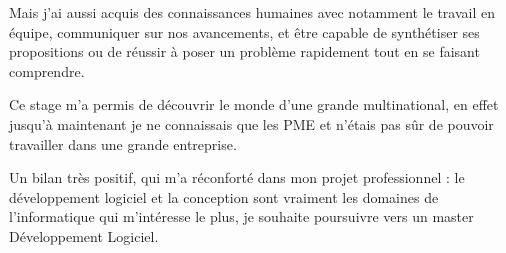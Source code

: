 	Mais j'ai aussi acquis des connaissances humaines avec notamment le travail en équipe, communiquer sur nos avancements, et être capable de synthétiser ses
	propositions ou de réussir à poser un problème rapidement tout en se faisant comprendre.

	Ce stage m'a permis de découvrir le monde d'une grande multinational, en effet jusqu'à maintenant je ne connaissais que les PME et n'étais pas sûr de pouvoir
	travailler dans une grande entreprise.

	Un bilan très positif, qui m'a réconforté dans mon projet professionnel : le développement logiciel et la conception sont vraiment les domaines de
	l'informatique qui m'intéresse le plus, je souhaite poursuivre vers un master Développement Logiciel.